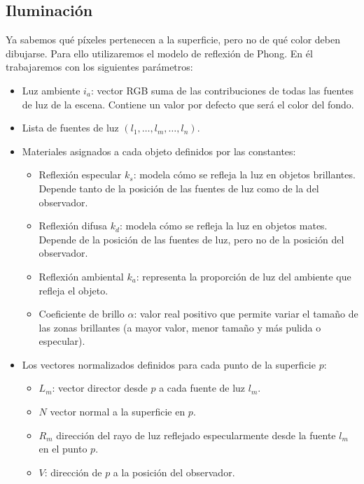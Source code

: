\subsection{Iluminación}
Ya sabemos qué píxeles pertenecen a la superficie, pero no de qué color deben dibujarse. Para ello utilizaremos el modelo de reflexión de Phong. En él trabajaremos con los siguientes parámetros:
\begin{itemize}
  \item Luz ambiente $i_a$: vector RGB suma de las contribuciones de todas las fuentes de luz de la escena. Contiene un valor por defecto que será el color del fondo.
  \item Lista de fuentes de luz $(l_1, \dots, l_m, \dots, l_n)$.
  \item Materiales asignados a cada objeto definidos por las constantes:
      \begin{itemize}
          \item Reflexión especular $k_s$: modela cómo se refleja la luz en objetos brillantes. Depende tanto de la posición de las fuentes de luz como de la del observador.
          \item Reflexión difusa $k_d$: modela cómo se refleja la luz en objetos mates. Depende de la posición de las fuentes de luz, pero no de la posición del observador.
          \item Reflexión ambiental $k_a$: representa la proporción de luz del ambiente que refleja el objeto.
          \item Coeficiente de brillo $\alpha$: valor real positivo que permite variar el tamaño de las zonas brillantes (a mayor valor, menor tamaño y más pulida o especular).
      \end{itemize}
  
  \item Los vectores normalizados definidos para cada punto de la superficie $p$:
        \begin{itemize}
          \item $L_m$: vector director desde $p$ a cada fuente de luz $l_m$.
          \item $N$ vector normal a la superficie en $p$.
          \item $R_m$ dirección del rayo de luz reflejado especularmente desde la fuente $l_m$ en el punto $p$.
          \item $V$: dirección de $p$ a la posición del observador.
        \end{itemize}
\end{itemize}

